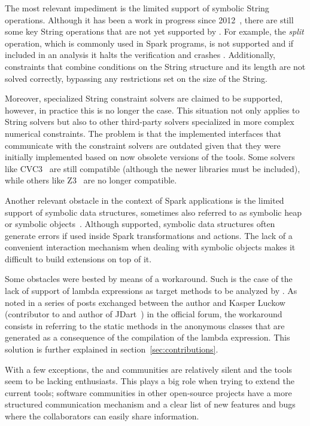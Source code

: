 The most relevant impediment is the limited support of symbolic String operations. Although it has been a work in progress since 2012~\cite{Redelinghuys2012,Pasareanu2013}, there are still some key String operations that are not yet supported by \spf{}. For example, the \textit{split} operation, which is commonly used in Spark programs, is not supported and if included in an analysis it halts the verification and crashes \jpf{}. Additionally, constraints that combine conditions on the String structure and its length are not solved correctly, bypassing any restrictions set on the size of the String.

Moreover, specialized String constraint solvers are claimed to be supported, however, in practice this is no longer the case. This situation not only applies to String solvers but also to other third-party solvers specialized in more complex numerical constraints. The problem is that the implemented interfaces that communicate with the constraint solvers are outdated given that they were initially implemented based on now obsolete versions of the tools. Some solvers like CVC3~\cite{Barrett2007} are still compatible (although the newer libraries must be included), while others like Z3~\cite{DeMoura2008} are no longer compatible.

Another relevant obstacle in the context of Spark applications is the limited support of symbolic data structures, sometimes also referred to as symbolic heap or symbolic objects~\cite{Pasareanu2010}. Although supported, symbolic data structures often generate errors if used inside Spark transformations and actions. The lack of a convenient interaction mechanism when dealing with symbolic objects makes it difficult to build extensions on top of it.

Some obstacles were bested by means of a workaround. Such is the case of the lack of support of lambda expressions as target methods to be analyzed by \spf{}. As noted in a series of posts exchanged between the author and Kasper Luckow (contributor to \spf{} and author of JDart~\cite{Luckow2016}) in the official \jpf{} forum, the workaround consists in referring to the static methods in the anonymous classes that are generated as a consequence of the compilation of the lambda expression. This solution is further explained in section~\ref{sec:contributions}.

With a few exceptions, the \jpf{} and \spf{} communities are relatively silent and the tools seem to be lacking enthusiasts. This plays a big role when trying to extend the current tools; software communities in other open-source projects have a more structured communication mechanism and a clear list of new features and bugs where the collaborators can easily share information.

